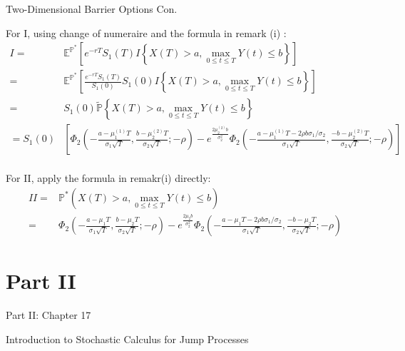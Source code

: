\documentclass{beamer}
\begin{document}
\begin{frame}{Two-Dimensional Barrier Options Con.}

    {\footnotesize \footnotesize
    \par For I, using change of numeraire and the formula in remark (i) :
    {\footnotesize \tiny
    \begin{align*}
        I = & \mathbb{E}^{\mathbb{P}^*}\left[ e^{-rT}S_1(T) I{\left\{ X(T) > a, \max\limits_{0 \leq t \leq T} Y(t) \leq b \right\}} \right] \\
        = & \mathbb{E}^{\mathbb{P}^*}\left[ \frac{e^{-rT}S_1(T)}{S_1(0)}S_1(0) I{\left\{ X(T) > a, \max\limits_{0 \leq t \leq T} Y(t) \leq b \right\}} \right] \\
        = &  S_1(0) \tilde{\mathbb{P}}{\left\{ X(T) > a, \max\limits_{0 \leq t \leq T} Y(t) \leq b \right\}} \\
        = S_1(0) & \left[\Phi_2 \left( -\frac{a - \mu_1^{(1)} T}{\sigma_1 \sqrt{T}}, \frac{b - \mu_2^{(2)} T}{\sigma_2 \sqrt{T}}; -\rho \right)
        - e^{\frac{2 \mu_2^{(2)} b}{\sigma_2^2} } \Phi_2 \left( -\frac{a - \mu_1^{(1)} T - 
        2\rho b\sigma_1/\sigma_2}{\sigma_1 \sqrt{T}}, \frac{-b - \mu_2^{(2)} T}{\sigma_2 \sqrt{T}}; -\rho \right)\right]\\
    \end{align*}
    }
    \par For II, apply the formula in remakr(i) directly:
    {\footnotesize \tiny
    \begin{align*}
        II = & {\mathbb{P}^*}(X(T) > a, \max\limits_{0 \leq t \leq T} Y(t) \leq b)\\
        = & \Phi_2 \left( -\frac{a - \mu_1 T}{\sigma_1 \sqrt{T}}, \frac{b - \mu_2 T}{\sigma_2 \sqrt{T}}; -\rho \right)
        - e^{\frac{2 \mu_2 b}{\sigma_2^2} } \Phi_2 \left( -\frac{a - \mu_1 T - 
        2\rho b\sigma_1/\sigma_2}{\sigma_1 \sqrt{T}}, \frac{-b - \mu_2 T}{\sigma_2 \sqrt{T}}; -\rho \right)
    \end{align*}
    }
    }
    
\end{frame}

\section{Part II}
\begin{frame}{Part II: Chapter 17}
    \begin{center}
        Introduction to Stochastic
    Calculus for Jump
    Processes
    \end{center}
\end{frame}
\end{document}
